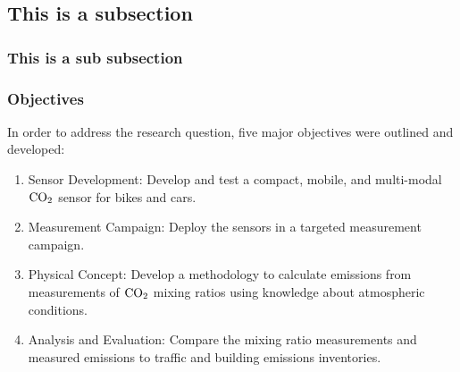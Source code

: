 \subsection{This is a subsection }
\label{sec:subsection2}


\subsubsection{This is a sub subsection}
\label{sec:subsubsection1}


\subsubsection{Objectives}
In order to address the research question, five major objectives were outlined and developed:
\begin{enumerate}
	\item Sensor Development: Develop and test a compact, mobile, and multi-modal $\rm{CO}_2$ sensor for bikes and cars.
	\item Measurement Campaign: Deploy the sensors in a targeted measurement campaign.
	\item Physical Concept: Develop a methodology to calculate emissions from measurements of $\rm{CO}_2$ mixing ratios using knowledge about atmospheric conditions. 
	\item Analysis and Evaluation: Compare the mixing ratio measurements and measured emissions to traffic and building emissions inventories. 
\end{enumerate}

